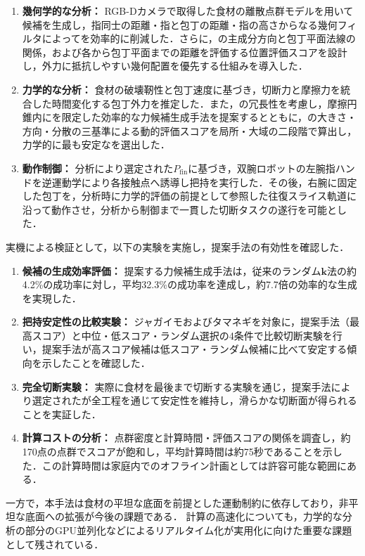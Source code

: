 \begin{enumerate}
	\item \textbf{幾何学的な分析：} RGB-Dカメラで取得した食材の離散点群モデルを用いて{\nameholdingpointset}候補を生成し，指同士の距離・指と包丁の距離・指の高さからなる幾何フィルタによって{\namesearchspace}を効率的に削減した．さらに，{\nameholdingpointset}の主成分方向と包丁平面法線の関係，および各{\namefingerpoint}から包丁平面までの距離を評価する位置評価スコアを設計し，外力に抵抗しやすい幾何配置を優先する仕組みを導入した．
	\item \textbf{力学的な分析：} 食材の破壊靭性と包丁速度に基づき，切断力と摩擦力を統合した時間変化する包丁外力を推定した．また，{\namegraspforce}の冗長性を考慮し，摩擦円錐内に{\namefingerforce}を限定した効率的な力候補生成手法を提案するとともに，{\namefingerforce}の大きさ・方向・分散の三基準による動的評価スコアを局所・大域の二段階で算出し，力学的に最も安定な{\nameholdingpointset}を選出した．
	\item \textbf{動作制御：} 分析により選定された{\nameholdingpointset}$P_{\mathrm{fin}}$に基づき，双腕ロボットの左腕指ハンドを逆運動学により各接触点へ誘導し把持を実行した．その後，右腕に固定した包丁を，分析時に力学的評価の前提として参照した往復スライス軌道に沿って動作させ，分析から制御まで一貫した切断タスクの遂行を可能とした．
\end{enumerate}

実機による検証として，以下の実験を実施し，提案手法の有効性を確認した．
\begin{enumerate}
	\item \textbf{{\namegraspforce}候補の生成効率評価：} 提案する力候補生成手法は，従来のランダム$\bm{k}$法の約4.2\%の成功率に対し，平均32.3\%の成功率を達成し，約7.7倍の効率的な生成を実現した．
	\item \textbf{把持安定性の比較実験：} ジャガイモおよびタマネギを対象に，提案手法（最高スコア）と中位・低スコア・ランダム選択の4条件で比較切断実験を行い，提案手法が高スコア候補は低スコア・ランダム候補に比べて安定する傾向を示したことを確認した．
	\item \textbf{完全切断実験：} 実際に食材を最後まで切断する実験を通じ，提案手法により選定された{\nameholdingpointset}が全工程を通じて安定性を維持し，滑らかな切断面が得られることを実証した．
	\item \textbf{計算コストの分析：} 点群密度と計算時間・評価スコアの関係を調査し，約170点の点群でスコアが飽和し，平均計算時間は約75秒であることを示した．この計算時間は家庭内でのオフライン計画としては許容可能な範囲にある．
\end{enumerate}

一方で，本手法は食材の平坦な底面を前提とした運動制約に依存しており，非平坦な底面への拡張が今後の課題である．
計算の高速化についても，力学的な分析の部分のGPU並列化などによるリアルタイム化が実用化に向けた重要な課題として残されている．
